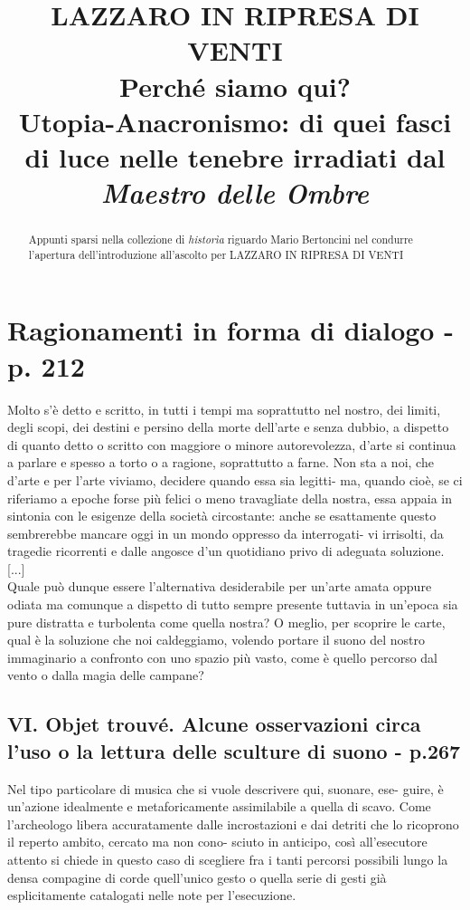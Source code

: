 \documentclass[12pt,a4paper]{article}
\title{\Huge\bfseries LAZZARO IN RIPRESA DI VENTI\\
\Large Perché siamo qui?\\
\normalsize Utopia-Anacronismo: di quei fasci di luce nelle tenebre irradiati dal \emph{Maestro delle Ombre}}
\author{}
\date{}
\begin{document}
\maketitle

\begin{abstract}
Appunti sparsi nella collezione di \emph{historìa} riguardo Mario Bertoncini nel condurre l'apertura dell'introduzione all'ascolto per LAZZARO IN RIPRESA DI VENTI
\end{abstract}

\tableofcontents
\newpage

\section{Ragionamenti in forma di dialogo - p. 212}

Molto s’è detto e scritto, in tutti i tempi ma soprattutto nel nostro, dei limiti,
degli scopi, dei destini e persino della morte dell’arte e senza dubbio, a dispetto di
quanto detto o scritto con maggiore o minore autorevolezza, d’arte si continua a
parlare e spesso a torto o a ragione, soprattutto a farne.
Non sta a noi, che d’arte e per l’arte viviamo, decidere quando essa sia legitti-
ma, quando cioè, se ci riferiamo a epoche forse più felici o meno travagliate della
nostra, essa appaia in sintonia con le esigenze della società circostante: anche se
esattamente questo sembrerebbe mancare oggi in un mondo oppresso da interrogati-
vi irrisolti, da tragedie ricorrenti e dalle angosce d’un quotidiano privo di adeguata
soluzione.\\

[...]\\

Quale può dunque essere l’alternativa desiderabile per un’arte amata oppure
odiata ma comunque a dispetto di tutto sempre presente tuttavia in un’epoca sia
pure distratta e turbolenta come quella nostra? O meglio, per scoprire le carte, qual
è la soluzione che noi caldeggiamo, volendo portare il suono del nostro immaginario
a confronto con uno spazio più vasto, come è quello percorso dal vento o dalla magia
delle campane?\\


\subsection{VI. Objet trouvé. Alcune osservazioni circa l’uso o la lettura delle sculture di suono - p.267}

Nel tipo particolare di musica che si vuole descrivere qui, suonare, ese-
guire, è un’azione idealmente e metaforicamente assimilabile a quella
di scavo. Come l’archeologo libera accuratamente dalle incrostazioni
e dai detriti che lo ricoprono il reperto ambito, cercato ma non cono-
sciuto in anticipo, così all’esecutore attento si chiede in questo caso
di scegliere fra i tanti percorsi possibili lungo la densa compagine
di corde quell’unico gesto o quella serie di gesti già esplicitamente
catalogati nelle note per l’esecuzione.
\\
[...]\\
\end{document}
